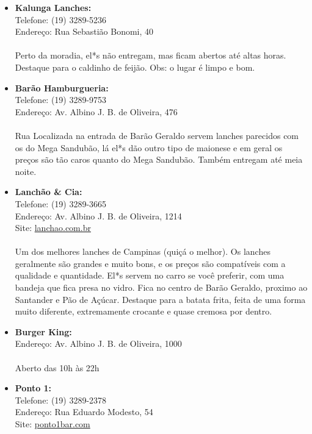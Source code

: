 \begin{itemize}
    \item   \textbf{Kalunga Lanches:}
        \\Telefone: (19) 3289-5236
        \\Endereço: Rua Sebastião Bonomi, 40
        \\\\
        Perto da moradia, el*s não entregam, mas ficam abertos até altas horas.
        Destaque para o caldinho de feijão. Obs: o lugar é limpo e bom.

    \item   \textbf{Barão Hamburgueria:}
        \\Telefone: (19) 3289-9753
        \\Endereço: Av. Albino J. B. de Oliveira, 476
        \\\\
        Rua Localizada na entrada de Barão Geraldo servem lanches parecidos com
        os do Mega Sandubão, lá el*s dão outro tipo de maionese e em geral os
        preços são tão caros quanto do Mega Sandubão. Também entregam até meia
        noite.

    \item   \textbf{Lanchão \& Cia:}
        \\Telefone: (19) 3289-3665
        \\Endereço: Av. Albino J. B. de Oliveira, 1214
        \\Site: \url{lanchao.com.br}
        \\\\
        Um dos melhores lanches de Campinas (quiçá o melhor). Os lanches
        geralmente são grandes e muito bons, e os preços são compatíveis com a
        qualidade e quantidade. El*s servem no carro se você preferir, com uma
        bandeja que fica presa no vidro. Fica no centro de Barão Geraldo,
        proximo ao Santander e Pão de Açúcar. Destaque para a batata frita,
        feita de uma forma muito diferente, extremamente crocante e quase
        cremosa por dentro.

    \item   \textbf{Burger King:}
        \\Endereço: Av. Albino J. B. de Oliveira, 1000
        \\\\
        Aberto das 10h às 22h

    \item   \textbf{Ponto 1:}
        \\Telefone: (19) 3289-2378
        \\Endereço: Rua Eduardo Modesto, 54
        \\Site: \url{ponto1bar.com}


\end{itemize}
